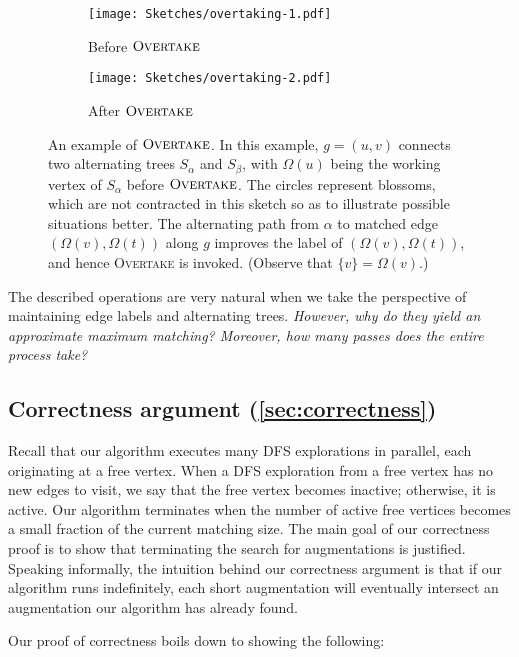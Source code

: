 \documentclass{article}
\newcommand{\alp}{\alpha}
\newcommand{\Omg}{\Omega}
\newcommand{\algOvertake}{\textsc{Overtake}\xspace}
\begin{document}
\begin{figure}
\centering
    \begin{subfigure}[t]{0.45\linewidth}
        \centering
        \texttt{[image: Sketches/overtaking-1.pdf]}
        \caption{Before $\algOvertake$}
    \end{subfigure}
    \hfill
\begin{subfigure}[t]{0.45\linewidth}
        \centering
        \texttt{[image: Sketches/overtaking-2.pdf]}
        \caption{After $\algOvertake$}
    \end{subfigure}
    \caption{An example of $\algOvertake$. In this example, $g = (u, v)$ connects two alternating trees $S_\alp$ and $S_\beta$, with $\Omg(u)$ being the working vertex of $S_\alp$ before $\algOvertake$. The circles represent blossoms, which are not contracted in this sketch so as to illustrate possible situations better. 
    The alternating path from $\alp$ to matched edge $(\Omg(v), \Omg(t))$ along $g$ improves the label of $(\Omg(v), \Omg(t))$, and hence \algOvertake is invoked. (Observe that $\{v\} = \Omg(v)$.)
}
    \label{fig:overtaking-example1-overview}
\end{figure}

The described operations are very natural when we take the perspective of maintaining edge labels and alternating trees.
\emph{However, why do they yield an approximate maximum matching? Moreover, how many passes does the entire process take?}


\subsection{Correctness argument (\cref{sec:correctness})}
Recall that our algorithm executes many DFS explorations in parallel, each originating at a free vertex. 
When a DFS exploration from a free vertex has no new edges to visit, we say that the free vertex becomes inactive; otherwise, it is active.
Our algorithm terminates when the number of active free vertices becomes a small fraction of the current matching size. The main goal of our correctness proof is to show that terminating the search for augmentations is justified. Speaking informally, the intuition behind our correctness argument is that if our algorithm runs indefinitely, each short augmentation will eventually intersect an augmentation our algorithm has already found.

Our proof of correctness boils down to showing the following:
\end{document}
